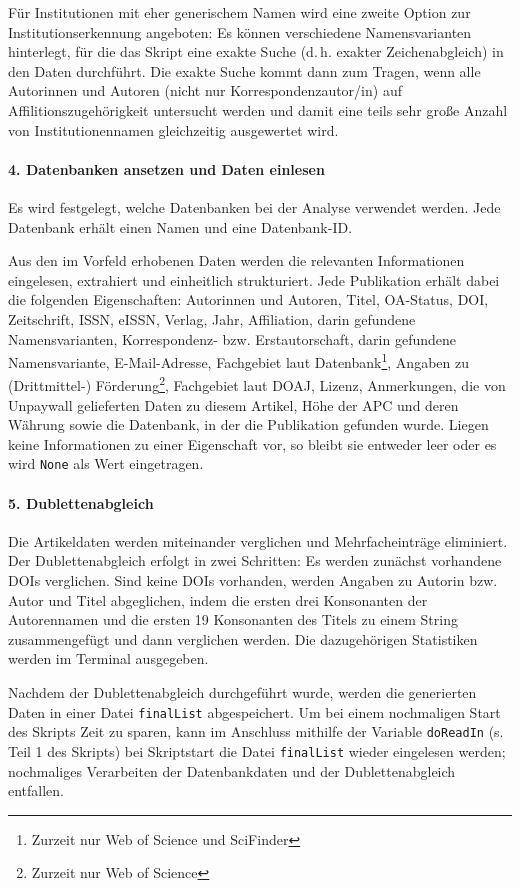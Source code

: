 Für Institutionen mit eher generischem Namen wird eine zweite Option zur Institutionserkennung angeboten: Es können verschiedene Namensvarianten hinterlegt, für die das Skript eine exakte Suche (d.\,h. exakter Zeichenabgleich) in den Daten durchführt. Die exakte Suche kommt dann zum Tragen, wenn alle Autorinnen und Autoren (nicht nur Korrespondenzautor/in) auf Affilitionszugehörigkeit untersucht werden und damit eine teils sehr große Anzahl von Institutionennamen gleichzeitig ausgewertet wird.

\paragraph{4. Datenbanken ansetzen und Daten einlesen} \label{readinput}
Es wird festgelegt, welche Datenbanken bei der Analyse verwendet werden. Jede Datenbank erhält einen Namen und eine Datenbank-ID.

Aus den im Vorfeld erhobenen Daten werden die relevanten Informationen eingelesen, extrahiert und einheitlich strukturiert. Jede Publikation erhält dabei die folgenden Eigenschaften: Autorinnen und Autoren, Titel, OA-Status, DOI, Zeitschrift, ISSN, eISSN, Verlag, Jahr, Affiliation, darin gefundene Namensvarianten, Korrespon\-denz- bzw. Erstautorschaft, darin gefundene Namensvariante, E-Mail-Adresse, Fachgebiet laut Datenbank\footnote{Zurzeit nur Web of Science und SciFinder}, Angaben zu (Drittmittel-) Förderung\footnote{Zurzeit nur Web of Science}, Fachgebiet laut DOAJ, Lizenz, Anmerkungen, die von Unpaywall gelieferten Daten zu diesem Artikel, Höhe der APC und deren Währung sowie die Datenbank, in der die Publikation gefunden wurde. Liegen keine Informationen zu einer Eigenschaft vor, so bleibt sie entweder leer oder es wird \texttt{None} als Wert eingetragen.

\paragraph{5. Dublettenabgleich} \label{func-duplicates} Die Artikeldaten werden miteinander verglichen und Mehrfacheinträge eliminiert. Der Dublettenabgleich erfolgt in zwei Schritten: Es werden  zunächst vorhandene DOIs verglichen. Sind keine DOIs vorhanden, werden Angaben zu Autorin bzw. Autor und Titel abgeglichen, indem die ersten drei Konsonanten der Autorennamen und die ersten 19 Konsonanten des Titels zu einem String zusammengefügt und dann verglichen werden. Die dazugehörigen Statistiken werden im Terminal ausgegeben.

Nachdem der Dublettenabgleich durchgeführt wurde, werden die generierten Daten in einer Datei \texttt{finalList} abgespeichert. Um bei einem nochmaligen Start des Skripts Zeit zu sparen, kann im Anschluss mithilfe der Variable \texttt{doReadIn} (s. Teil 1 des Skripts) bei Skriptstart die Datei \texttt{finalList} wieder eingelesen werden; nochmaliges Verarbeiten der Datenbankdaten und der Dublettenabgleich entfallen.


